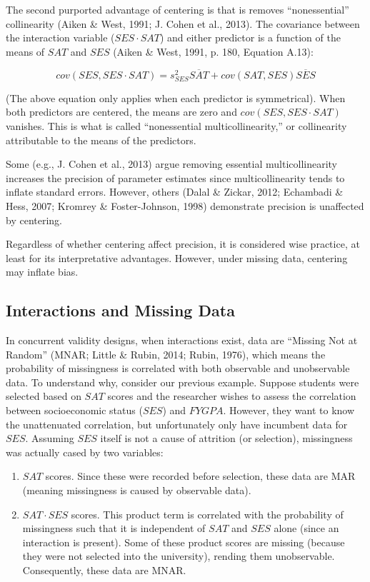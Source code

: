 \documentclass[english,man]{apa6}
\providecommand{\tightlist}{%
  \setlength{\itemsep}{0pt}\setlength{\parskip}{0pt}}
\theoremstyle{definition}
\theoremstyle{definition}
\theoremstyle{remark}
\begin{document}
The second purported advantage of centering is that is removes
\enquote{nonessential} collinearity (Aiken \& West, 1991; J. Cohen et
al., 2013). The covariance between the interaction variable
(\(SES\cdot SAT\)) and either predictor is a function of the means of
\(SAT\) and \(SES\) (Aiken \& West, 1991, p. 180, Equation A.13):

\begin{equation}
cov(SES, SES\cdot SAT) = s^2_{SES} \overline{SAT} + cov(SAT, SES) \overline{SES}
\label{eq:correction}
\end{equation}

\noindent (The above equation only applies when each predictor is
symmetrical). When both predictors are centered, the means are zero and
\(cov(SES, SES\cdot SAT)\) vanishes. This is what is called
\enquote{nonessential multicollinearity,} or collinearity attributable
to the means of the predictors.

Some (e.g., J. Cohen et al., 2013) argue removing essential
multicollinearity increases the precision of parameter estimates since
multicollinearity tends to inflate standard errors. However, others
(Dalal \& Zickar, 2012; Echambadi \& Hess, 2007; Kromrey \&
Foster-Johnson, 1998) demonstrate precision is unaffected by centering.

Regardless of whether centering affect precision, it is considered wise
practice, at least for its interpretative advantages. However, under
missing data, centering may inflate bias.

\subsection{Interactions and Missing
Data}\label{interactions-and-missing-data}

In concurrent validity designs, when interactions exist, data are
\enquote{Missing Not at Random} (MNAR; Little \& Rubin, 2014; Rubin,
1976), which means the probability of missingness is correlated with
both observable and unobservable data. To understand why, consider our
previous example. Suppose students were selected based on \(SAT\) scores
and the researcher wishes to assess the correlation between
socioeconomic status (\(SES\)) and \(FYGPA\). However, they want to know
the unattenuated correlation, but unfortunately only have incumbent data
for \(SES\). Assuming \(SES\) itself is not a cause of attrition (or
selection), missingness was actually cased by two variables:

\begin{enumerate}
\def\labelenumi{(\arabic{enumi})}
\tightlist
\item
  \(SAT\) scores. Since these were recorded before selection, these data
  are MAR (meaning missingness is caused by observable data).
\item
  \(SAT\cdot SES\) scores. This product term is correlated with the
  probability of missingness such that it is independent of \(SAT\) and
  \(SES\) alone (since an interaction is present). Some of these product
  scores are missing (because they were not selected into the
  university), rending them unobservable. Consequently, these data are
  MNAR.
\end{enumerate}
\end{document}
